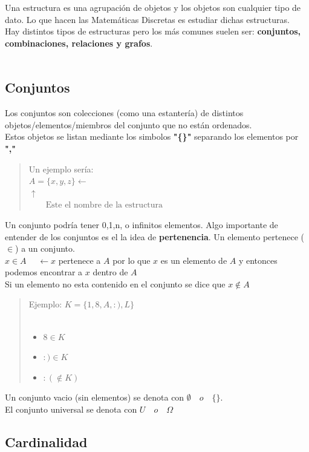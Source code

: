 \documentclass{article}
\begin{document}
Una estructura es una agrupación de objetos y los objetos son cualquier tipo
de dato.
Lo que hacen las Matemáticas Discretas es estudiar dichas estructuras.\\
Hay distintos tipos de estructuras pero los más comunes suelen ser:
\textbf{conjuntos, combinaciones, relaciones y grafos}.\\\\

\subsection{Conjuntos}

Los conjuntos son colecciones (como una estantería) de distintos
objetos/elementos/miembros del conjunto que no están ordenados.\\

Estos objetos se listan mediante los simbolos \textbf{"\{\}"}
separando los elementos por \textbf{","}

\begin{quote}
    Un ejemplo sería:\\
    $ A = \{x, y, z\} \leftarrow$  \\
    $\uparrow $\\
    $\qquad \text{Este el nombre de la estructura}$ \\
\end{quote}

Un conjunto podría tener 0,1,n, o infinitos elementos.
Algo importante de entender de los conjuntos es el la idea de \textbf{pertenencia}.
Un elemento pertenece ($\in $) a un conjunto.\\

\textbf{$x \in A \quad$} $\leftarrow  x$ pertenece a $A$ por lo que $x$ es un elemento
de $A$ y entonces podemos encontrar a $x$ dentro de $A$\\

Si un elemento no esta contenido en el conjunto se dice que \textbf{$x \notin A$}\\

\begin{quote}
    Ejemplo:
    $K = \{1, 8, A, :), L\}$\\\\
    \begin{itemize}
        \item $8 \in K$\\
        \item $:) \in K$\\
        \item $:( \notin K)$\\
    \end{itemize}
\end{quote}
Un conjunto vacio (sin elementos) se denota con $ \emptyset \quad o \quad \{\}$.\\
El conjunto universal se denota con $ U \quad o \quad \Omega$

\subsection{Cardinalidad}
\end{document}
